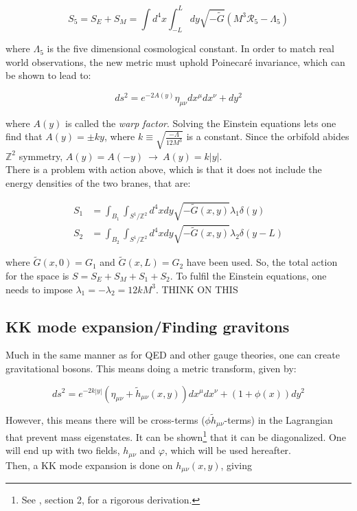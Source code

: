 \documentclass[11pt,a4paper]{article}
\begin{document}
\begin{equation}
	S_5 = S_E + S_M = \int d^4x \int_{-L}^{L} dy \sqrt{-\tilde{G}}(M^3\mathcal{R}_5 - \Lambda_5)
\end{equation}

where $\Lambda_5$ is the five dimensional cosmological constant. In order to match real world observations, the new metric must uphold Poinecaré invariance, which can be shown to lead to:

\begin{equation}
	ds^2 = e^{-2A(y)}\eta_{\mu\nu}dx^\mu dx^\nu + dy^2
	\label{eq:RS_lineelement}
\end{equation}

where $A(y)$ is called the \emph{warp factor}. Solving the Einstein equations lets one find that $A(y) = \pm ky$, where $k \equiv \sqrt{\frac{-\Lambda}{12M^3}}$ is a constant. Since the orbifold abides $\mathbb{Z}^2$ symmetry, $A(y) = A(-y) \:\rightarrow\: A(y) = k|y|$.\\
There is a problem with action above, which is that it does not include the energy densities of the two branes, that are:

\begin{align}
	S_1 &= \int_{B_1}\int_{S^1/\mathbb{Z}^2}d^4xdy \sqrt{-\tilde{G}(x,y)}\lambda_1\delta(y)\\
	S_2 &= \int_{B_2}\int_{S^1/\mathbb{Z}^2}d^4xdy \sqrt{-\tilde{G}(x,y)}\lambda_2\delta(y-L)
\end{align}

where $\tilde{G}(x,0) = G_1$ and $\tilde{G}(x,L) = G_2$ have been used. So, the total action for the space is $S = S_E+S_M+S_1+S_2$. To fulfil the Einstein equations, one needs to impose $\lambda_1 = -\lambda_2 = 12kM^3$. THINK ON THIS

\subsection{KK mode expansion/Finding gravitons}
Much in the same manner as for QED and other gauge theories, one can create gravitational bosons. This means doing a metric transform, given by:

\begin{equation}
	ds^2 = e^{-2k|y|}(\eta_{\mu\nu} + \tilde{h}_{\mu\nu}(x,y))dx^\mu dx^\nu + (1+\phi(x))dy^2
\end{equation}

However, this means there will be cross-terms ($\phi \tilde{h}_{\mu\nu}$-terms) in the Lagrangian that prevent mass eigenstates. It can be shown\footnote{See , section 2, for a rigorous derivation.} that it can be diagonalized. One will end up with two fields, $h_{\mu\nu}$ and $\varphi$, which will be used hereafter.\\
Then, a KK mode expansion is done on $h_{\mu\nu}(x,y)$, giving
\end{document}
